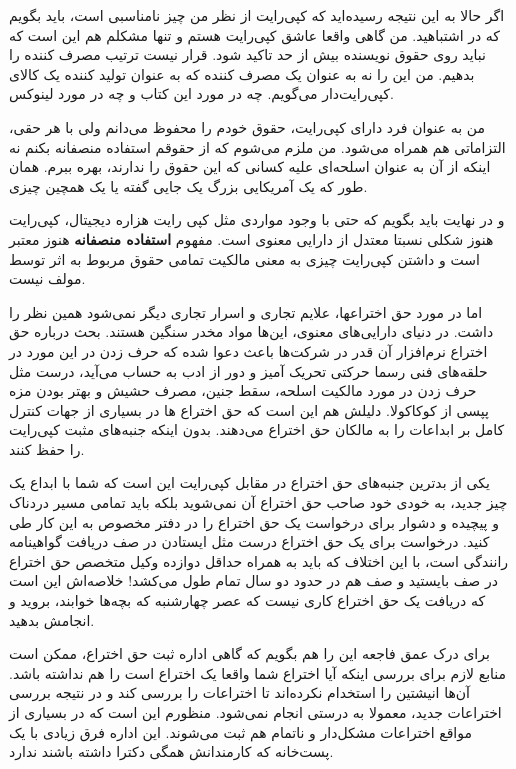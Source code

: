 اگر حالا به این نتیجه رسیده‌اید که کپی‌رایت از نظر من چیز نامناسبی‌ است،
باید بگویم که در اشتباهید. من گاهی واقعا عاشق کپی‌رایت هستم و تنها
مشکلم هم این است که نباید روی حقوق نویسنده بیش از حد تاکید شود. قرار
نیست ترتیب مصرف کننده را بدهیم. من این را نه به عنوان یک مصرف کننده که
به عنوان تولید کننده یک کالای کپی‌رایت‌دار می‌گویم. چه در مورد این کتاب و
چه در مورد لینوکس.

من به عنوان فرد دارای کپی‌رایت، حقوق خودم را محفوظ می‌دانم ولی با هر
حقی، التزاماتی هم همراه می‌شود. من ملزم می‌شوم که از حقوقم استفاده
منصفانه بکنم نه اینکه از آن به عنوان اسلحه‌ای علیه کسانی که این حقوق را
ندارند، بهره ببرم. همان طور که یک آمریکایی بزرگ یک جایی گفته
 یا یک همچین چیزی.

و در نهایت باید بگویم که حتی با وجود مواردی مثل کپی رایت هزاره
دیجیتال، کپی‌رایت هنوز شکلی نسبتا معتدل از دارایی معنوی است. مفهوم
\textbf{استفاده منصفانه} هنوز معتبر است و داشتن کپی‌رایت چیزی به
معنی مالکیت تمامی حقوق مربوط به اثر توسط مولف نیست.

اما در مورد حق اختراعها، علایم تجاری و اسرار تجاری دیگر نمی‌شود همین
نظر را داشت. در دنیای دارایی‌های معنوی، این‌ها مواد مخدر سنگین
هستند. بحث درباره حق اختراع نرم‌افزار آن قدر در شرکت‌ها باعث دعوا شده که
حرف زدن در این مورد در حلقه‌های فنی رسما حرکتی تحریک آمیز و دور از ادب
به حساب می‌آید،‌ درست مثل حرف زدن در مورد مالکیت اسلحه، سقط جنین، مصرف
حشیش و بهتر بودن مزه پپسی از کوکاکولا. دلیلش هم این است که حق اختراع
ها در بسیاری از جهات کنترل کامل بر ابداعات را به مالکان حق اختراع
می‌دهند. بدون اینکه جنبه‌های مثبت کپی‌رایت را حفظ کنند.

یکی از بدترین جنبه‌های حق اختراع در مقابل کپی‌رایت این است که شما با
ابداع یک چیز جدید، به خودی خود صاحب حق اختراع آن نمی‌شوید بلکه باید
تمامی مسیر دردناک و پیچیده و دشوار برای درخواست یک حق اختراع را در دفتر
مخصوص به این کار طی کنید. درخواست برای یک حق اختراع درست مثل ایستادن
در صف دریافت گواهینامه رانندگی است، با این اختلاف که باید به همراه
حداقل دوازده وکیل متخصص حق اختراع در صف بایستید و صف هم در حدود دو سال
تمام طول می‌کشد! خلاصه‌اش این است که دریافت یک حق اختراع کاری نیست که
عصر چهارشنبه که بچه‌ها خوابند، بروید و انجامش بدهید.

برای درک عمق فاجعه این را هم بگویم که گاهی اداره ثبت حق اختراع، ممکن
است منابع لازم برای بررسی اینکه آیا اختراع شما واقعا یک اختراع است را
هم نداشته باشد. آن‌ها انیشتین را استخدام نکرده‌اند تا اختراعات را بررسی کند و در نتیجه بررسی اختراعات
جدید، معمولا به درستی انجام نمی‌شود. منظورم این است که در بسیاری از
مواقع اختراعات مشکل‌دار و ناتمام هم ثبت می‌شوند. این اداره فرق زیادی با
یک پست‌خانه که کارمندانش همگی دکترا داشته باشند ندارد.

